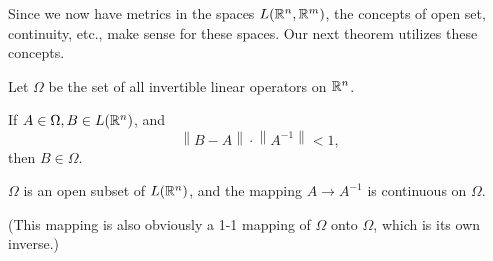
Since we now have metrics in the spaces $L({\protect\mathbb R}^n, {\protect\mathbb R}^m)$, the concepts of open set, continuity, etc., make sense for these spaces. 
Our next theorem utilizes these concepts.

\begin{thm}
    \label{thm:9.8}
    Let $\Omega$ be the set of all invertible linear operators on ${\protect\mathbb R}^n$.
    \begin{asparaenum}[(a)]
        \item If $A \in \Omega, B \in L({\protect\mathbb R}^n)$, and 
        \begin{equation*}
            \left\| B - A \right\| \cdot \left\| A^{-1} \right\| < 1,
        \end{equation*}
        then $B \in \Omega$.
        \item $\Omega$ is an open subset of $L({\protect\mathbb R}^n)$, 
        and the mapping $A \rightarrow A^{-1}$ is continuous on $\Omega$.
    \end{asparaenum}
    (This mapping is also obviously a 1-1 mapping of $\Omega$ onto $\Omega$, which is its own inverse.)
\end{thm}


